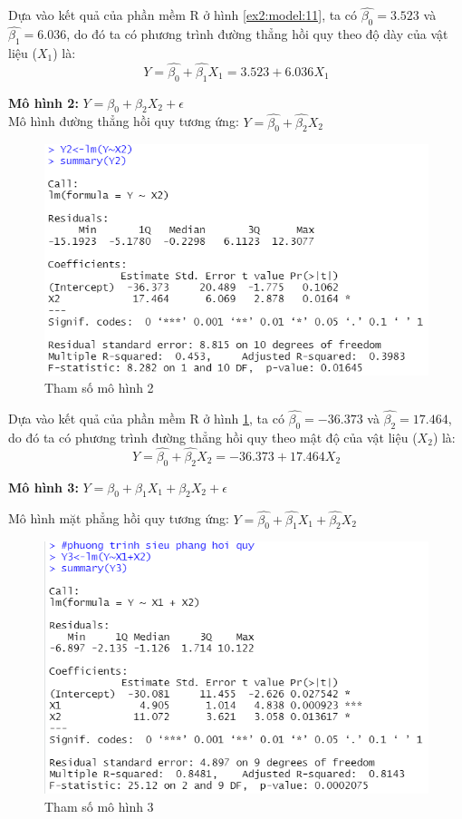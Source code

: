 \documentclass[a4paper]{article}
\theoremstyle{nonumberplain}
\begin{document}
Dựa vào kết quả của phần mềm R ở hình \ref{ex2:model:11}, ta có $\hat{\beta_0} = 3.523$ và $\hat{\beta_1} = 6.036$, do đó ta có phương trình đường thẳng hồi quy theo độ dày của vật liệu ($X_1$) là:
\[Y = \hat{\beta_0} + \hat{\beta_1} X_1 = 3.523 + 6.036 X_1\]


\textbf{Mô hình 2:} $Y= \beta_0 + \beta_2 X_2 + \epsilon$\\
Mô hình đường thẳng hồi quy tương ứng: $Y= \hat{\beta_0} + \hat{\beta_2} X_2$

\begin{figure}[h!]
	\centering
	\includegraphics[scale =0.9]{bai2_1ii.PNG} 
	\caption{Tham số mô hình 2}
	\label{ex2:model:12}
\end{figure}

Dựa vào kết quả của phần mềm R ở hình \ref{ex2:model:12}, ta có $\hat{\beta_0} = -36.373$ và $\hat{\beta_2} = 17.464$, do đó ta có phương trình đường thẳng hồi quy theo mật độ của vật liệu ($X_2$) là:
\[Y = \hat{\beta_0} + \hat{\beta_2} X_2 = -36.373 + 17.464 X_2\]

\textbf{Mô hình 3:} $Y= \beta_0 + \beta_1 X_1 + \beta_2 X_2+ \epsilon$

Mô hình mặt phẳng hồi quy tương ứng: $Y= \hat{\beta_0} + \hat{\beta_1} X_1 + \hat{\beta_2} X_2$

\begin{figure}[h!]
	\centering
	\includegraphics[width=0.7\linewidth]{bai2_1iii.PNG} 
	\caption{Tham số mô hình 3}
	\label{ex2:model:13}
\end{figure}
\end{document}
